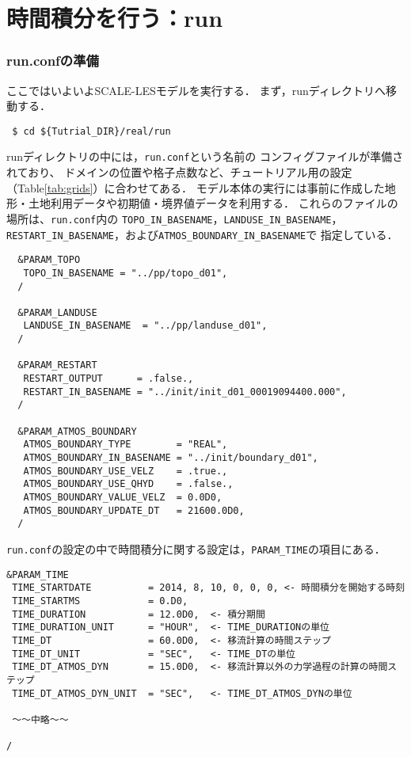 
\section{時間積分を行う：run}
\subsubsection{run.confの準備}
ここではいよいよSCALE-LESモデルを実行する．
まず，runディレクトリへ移動する．
\begin{verbatim}
 $ cd ${Tutrial_DIR}/real/run
\end{verbatim}

runディレクトリの中には，\verb|run.conf|という名前の
コンフィグファイルが準備されており、
ドメインの位置や格子点数など、チュートリアル用の設定（Table\ref{tab:grids}）に合わせてある．
モデル本体の実行には事前に作成した地形・土地利用データや初期値・境界値データを利用する．
これらのファイルの場所は、\verb|run.conf|内の
\verb|TOPO_IN_BASENAME|，\verb|LANDUSE_IN_BASENAME|，
\verb|RESTART_IN_BASENAME|，および\verb|ATMOS_BOUNDARY_IN_BASENAME|で
指定している．

\begin{verbatim}
  &PARAM_TOPO
   TOPO_IN_BASENAME = "../pp/topo_d01",
  /

  &PARAM_LANDUSE
   LANDUSE_IN_BASENAME  = "../pp/landuse_d01",
  /

  &PARAM_RESTART
   RESTART_OUTPUT      = .false.,
   RESTART_IN_BASENAME = "../init/init_d01_00019094400.000",
  /

  &PARAM_ATMOS_BOUNDARY
   ATMOS_BOUNDARY_TYPE        = "REAL",
   ATMOS_BOUNDARY_IN_BASENAME = "../init/boundary_d01",
   ATMOS_BOUNDARY_USE_VELZ    = .true.,
   ATMOS_BOUNDARY_USE_QHYD    = .false.,
   ATMOS_BOUNDARY_VALUE_VELZ  = 0.0D0,
   ATMOS_BOUNDARY_UPDATE_DT   = 21600.0D0,
  /
\end{verbatim}


\verb|run.conf|の設定の中で時間積分に関する設定は，\verb|PARAM_TIME|の項目にある．
\begin{verbatim}
&PARAM_TIME
 TIME_STARTDATE          = 2014, 8, 10, 0, 0, 0, <- 時間積分を開始する時刻
 TIME_STARTMS            = 0.D0,
 TIME_DURATION           = 12.0D0,  <- 積分期間
 TIME_DURATION_UNIT      = "HOUR",  <- TIME_DURATIONの単位
 TIME_DT                 = 60.0D0,  <- 移流計算の時間ステップ
 TIME_DT_UNIT            = "SEC",   <- TIME_DTの単位
 TIME_DT_ATMOS_DYN       = 15.0D0,  <- 移流計算以外の力学過程の計算の時間ステップ
 TIME_DT_ATMOS_DYN_UNIT  = "SEC",   <- TIME_DT_ATMOS_DYNの単位

 ～～中略～～

/
\end{verbatim}

